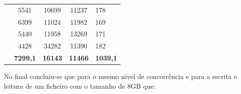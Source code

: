 \documentclass[pdftex,12pt,a4paper]{report}
\begin{document}
\begin{table}[!htb]
{\begin{tabular}{l|c|c|c|l|}
                                                            & 5541                                                      & 10699                                                 & 11237                                                    & 178                                                \\ \cline{2-5} 
                                                            & 6399                                                      & 11024                                                 & 11982                                                    & 169                                                \\ \cline{2-5} 
                                                            & 5440                                                      & 11958                                                 & 13269                                                    & 171                                                \\ \cline{2-5} 
                                                            & 4428                                                      & 34282                                                 & 11390                                                    & 182                                                \\ \hline
\rowcolor[HTML]{FFFC9E} 
\multicolumn{1}{|c|}{\cellcolor[HTML]{F8A102}\textbf{média}} & {\color[HTML]{333333} \textbf{7299,1}}                    & {\color[HTML]{333333} \textbf{16143}}                 & {\color[HTML]{333333} \textbf{11466}}                    & {\color[HTML]{333333} \textbf{1039,1}}             \\ \hline
\end{tabular}}
\end{table}

\newpage

No final concluiu-se que para o mesmo nível de concorrência e para a escrita e leitura de um ficheiro com o tamanho de 8GB que: 
\end{document}
